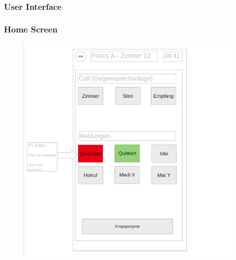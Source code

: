     \subsubsection{User Interface}
        \subsubsection*{Home Screen}
            \begin{figure}
            \centering
            \includegraphics[width=\linewidth]{graphics/homescreen-mockup}\label{fig:homescreen-mock}
            \end{figure}
